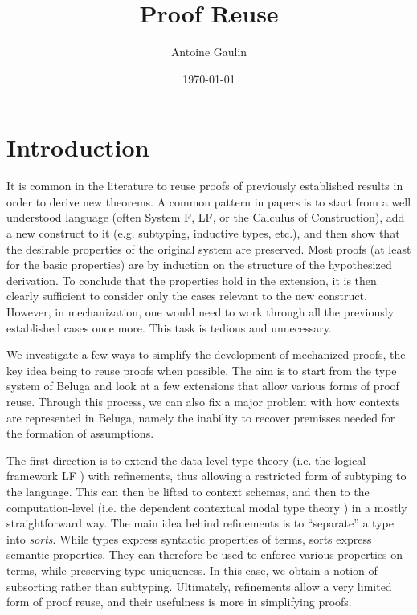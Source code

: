 \documentclass[letterpaper, 11pt]{article}
\title{Proof Reuse}
\date{\today}
\author{Antoine Gaulin}
\begin{document}
    \maketitle

    \section{Introduction}


    It is common in the literature to reuse proofs of previously established results in order to derive new theorems.  A common pattern in papers
    is to start from a well understood language (often System F, LF, or the Calculus of Construction), add a new construct to it (e.g. subtyping,
    inductive types, etc.), and then show that the desirable properties of the original system are preserved.  Most proofs (at least for the basic
    properties) are by induction on the structure of the hypothesized derivation.  To conclude that the properties hold in the extension, it is then
    clearly sufficient to consider only the cases relevant to the new construct.  However, in mechanization, one would need to work through all the
    previously established cases once more.  This task is tedious and unnecessary.

    We investigate a few ways to simplify the development of mechanized proofs, the key idea being to reuse proofs when possible.
    The aim is to start from the type system of Beluga \cite{Pientka2008, PientkaDunfield2008} and look at a few extensions that allow 
    various forms of proof reuse.
    Through this process, we can also fix a major problem with how contexts are represented in Beluga, namely the inability to
    recover premisses needed for the formation of assumptions.

    The first direction is to extend the data-level type theory (i.e. the logical framework LF \cite{LF1987}) with refinements, 
    thus allowing a restricted form of subtyping to the language.
    This can then be lifted to context schemas, and then to the computation-level (i.e. the dependent contextual modal type theory \cite{Nanevski2008})
    in a mostly straightforward way.  The main idea behind refinements is to ``separate'' a type into \textit{sorts}.  While types express
    syntactic properties of terms, sorts express semantic properties.  They can therefore be used to enforce various properties on terms,
    while preserving type uniqueness.  In this case, we obtain a notion of subsorting rather than subtyping.  Ultimately, refinements allow
    a very limited form of proof reuse, and their usefulness is more in simplifying proofs.
    
\end{document}

